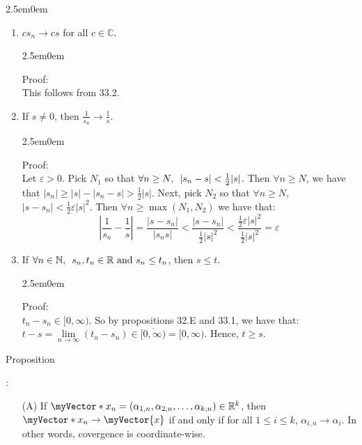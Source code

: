 \documentclass{book}
\newcommand{\hThree}{%
   \color{PineGreen}
   \fontsize{13}{15}\selectfont%
}
\newenvironment{myIndent}{%
   \begin{adjustwidth}{2.5em}{0em}%
}{%
   \end{adjustwidth}%
}
\newcommand{\retTwo}{\hfill\bigbreak}
\newcommand{\myHS}{ \hspace{0.5em}}
\newcounter{PropNumber}
\newcommand{\propCount}[1][1]{%
   \addtocounter{PropNumber}{#1}%
   \thePropNumber%
}
\newcommand{\mVec}[1]{\myVector{#1}}
\newcommand{\mVecAst}[1]{\myVector*{#1}}
\begin{document}
{\begin{myIndent}
\begin{enumerate}
         \item $cs_n \rightarrow cs$ for all $c \in \mathbb{C}$.
         
         {\begin{myIndent} \hThree
            Proof:\\
            This follows from 33.2.
            \retTwo
         \end{myIndent}}

         \item If $s \neq 0$, then $\frac{1}{s_n} \rightarrow \frac{1}{s}$.
         
         {\begin{myIndent} \hThree
            Proof:\\
            Let $\varepsilon > 0$. Pick $N_1$ so that $\forall n \geq N, \myHS |s_n - s| < \frac{1}{2}|s|$. Then $\forall n \geq N$, we have that $|s_n| \geq |s| - |s_n - s| > \frac{1}{2}|s|$. Next, pick $N_2$ so that $\forall n \geq N$, $|s - s_n| < \frac{1}{2}\varepsilon|s|^2$. Then $\forall n \geq \max(N_1, N_2)$ we have that:
            \[\left|\frac{1}{s_n} - \frac{1}{s}\right| = \frac{\left|s - s_n\right|}{\left|s_ns\right|} < \frac{\left|s - s_n\right|}{\frac{1}{2}|s|^2} < \frac{\frac{1}{2}\varepsilon|s|^2}{\frac{1}{2}|s|^2} = \varepsilon\]
            \retTwo
         \end{myIndent}}

         \item If $\forall n \in \mathbb{N}, \myHS s_n, t_n \in \mathbb{R} \text{ and } s_n \leq t_n$, then $s \leq t$.
         
         {\begin{myIndent} \hThree
            Proof:\\
            $t_n - s_n \in [0, \infty)$. So by propositions 32.E and 33.1, we have that:\\ $t - s = \lim\limits_{n\rightarrow \infty}{(t_n - s_n)} \in \overbar{[0, \infty)} = [0, \infty)$. Hence, $t \geq s$.
         \end{myIndent}}
      \end{enumerate}

      \newpage

      Proposition \propCount:
      \begin{itemize}
         \item[(A)] If $\mVecAst{x}_n = (\alpha_{1,n}, \alpha_{2,n}, \ldots, \alpha_{k,n}) \in \mathbb{R}^k$, then $\mVecAst{x}_n \rightarrow \mVec{x}$ if and only if for all $1 \leq i \leq k$, $\alpha_{i,n} \rightarrow \alpha_i$. In other words, covergence is coordinate-wise.
         

\end{itemize}
\end{myIndent}}
\end{document}
